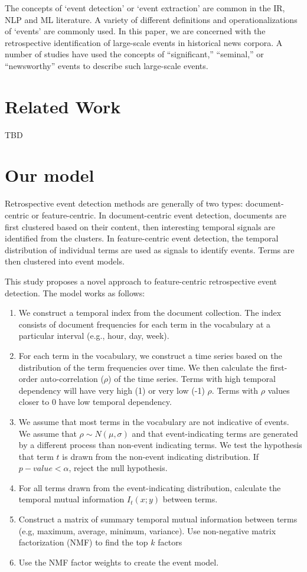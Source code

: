 \documentclass{sig-alternate}
\begin{document}
The concepts of `event detection' or `event extraction' are common in the IR, NLP and ML literature. A variety of different definitions and operationalizations of `events' are commonly used.  In this paper, we are concerned with the retrospective identification of large-scale events in historical news corpora. A number of studies have used the concepts of ``significant,'' ``seminal,'' or ``newsworthy'' events to describe such large-scale events.


\section{Related Work}

TBD

\section{Our model}

Retrospective event detection methods are generally of two types: document-centric or feature-centric.  In document-centric event detection, documents are first clustered based on their content, then interesting temporal signals are identified from the clusters.  In feature-centric event detection, the temporal distribution of individual terms are used as signals to identify events. Terms are then clustered into event models.  

This study proposes a novel approach to feature-centric retrospective event detection. The model works as follows:
\begin{enumerate}
\item We construct a temporal index from the document collection. The index consists of document frequencies for each term in the vocabulary at a particular interval (e.g., hour, day, week).
\item For each term in the vocabulary, we construct a time series based on the distribution of the term frequencies over time. We then calculate the first-order auto-correlation ($\rho$) of the time series. Terms with high temporal dependency will have very high (1) or very low (-1) $\rho$.  Terms with $\rho$ values closer to 0 have low temporal dependency. 
\item We assume that most terms in the vocabulary are not indicative of events. We assume that $\rho \sim N(\mu, \sigma)$ and that event-indicating terms are generated by a different process than non-event indicating terms.  We test the hypothesis that term $t$ is drawn from the non-event indicating distribution.  If $p-value < \alpha$, reject the null hypothesis.
\item For all terms drawn from the event-indicating distribution, calculate the temporal mutual information $I_t(x;y)$ between terms.
\item Construct a matrix of summary temporal mutual information between terms (e.g, maximum, average, minimum, variance). Use non-negative matrix factorization (NMF) to find the top $k$ factors
\item Use the NMF factor weights to create the event model.
\end{enumerate}
\end{document}

